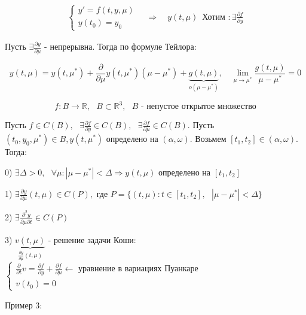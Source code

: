 \documentclass[12pt, a4paper]{report}
\begin{document}
\[ \begin{aligned}
\begin{cases}
y ' = f(t,y , \mu ) \\ 
y (t_0 )= y_0 
\end{cases}
\quad \Rightarrow \quad  
y(t, \mu) \, \text{ Хотим }: \exists  \frac{\partial  f }{\partial  y } 
\end{aligned} \] 

Пусть  \( \exists  \frac{\partial  y }{\partial \mu }  \) - непрерывна. Тогда по формуле Тейлора: 

\[ y(t, \mu ) = y(t, \mu^* ) + \frac{\partial  }{\partial  \mu } y(t,\mu ^* ) (\mu - \mu^* ) +\underbrace{ g (t, \mu )}_{o(\mu - \mu^*)} , \quad  \lim_{\mu  \to \mu^ * } \frac{ g(t, \mu )}{\mu - \mu^* } = 0   \] 

\[ f: B \to  \mathbb{R} , \text{ }  B \subset \mathbb{R}    ^3  , \text{ }  B \text{ - непустое открытое множество}  \] 

\begin{theorem} [Теорема 3.]
    Пусть \(  f \in  C (B ) , \text{ }  \exists  \frac{\partial  f }{\partial  y } \in  C (B ) , \text{  } \exists  \frac{\partial  f }{\partial  \mu } \in  C (B )     \). Пусть \( (t_0 , y_0 , \mu^* ) \in  B   , y(t, \mu ^* )   \)  определено на \( (\alpha , \omega ) \). Возьмем \( [t_1,t_2 ] \in (\alpha , \omega ) \). Тогда: 
    
    0) \( \displaystyle  \exists  \Delta > 0 , \text{ }  \forall  \mu : |\mu - \mu^*    |  < \Delta \Rightarrow y( t, \mu )\) определено на \( [ t_1,t_2 ] \) 

    1) \(\displaystyle  \exists  \frac{\partial  y }{\partial  \mu } (t, \mu) \in  C (P) ,  \) где \( P= \{(t,\mu ): t \in  [t_1, t_2 ] , \text{ } |\mu - \mu^* | < \Delta \} \) 

    2) \( \displaystyle  \exists  \frac{\partial  ^2 y } {\partial  \mu \partial  t } \in  C ( P)  \) 

    3) \( \underbrace{v ( t ,\mu )}_{\frac{\partial  y }{\partial  \mu }(t,\mu ) } \) - решение задачи Коши: \( \begin{cases}
    \displaystyle \frac{\partial  }{\partial  t } v = \frac{\partial  f } {\partial  y } + \frac{\partial  f }{\partial  \mu } \xleftarrow{ }  \text{ уравнение в вариациях Пуанкаре}  \\ 
    v(t_0 )  = 0   
    \end{cases} \) 
\end{theorem}

Пример 3: 
\end{document}
